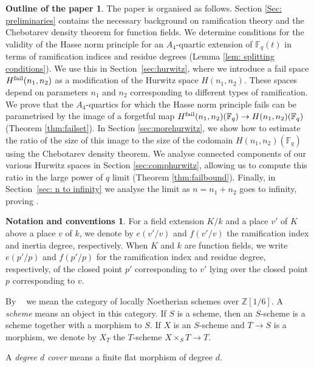 \documentclass{amsart}
\numberwithin{equation}{section} \numberwithin{figure}{section}
\DeclareMathOperator{\Schemes}{\underline{Schemes}}
\newcommand\ZZ{\mathbb{Z}}
\theoremstyle{one}
\theoremstyle{definition}
\newtheorem*{notation}{Notation and conventions}
\newtheorem*{outline}{Outline of the paper}
\begin{document}
\begin{outline}The paper is organised as follows. Section \ref{Sec: preliminaries} contains the necessary background on ramification theory and the Chebotarev density theorem for function fields. We determine conditions for the validity of the Hasse norm principle for an $A_4$-quartic extension of $\mathbb{F}_q(t)$ in terms of ramification indices and residue degrees (Lemma \ref{lem: splitting conditions}). We use this in Section~\ref{sec:hurwitz}, where we introduce a fail space $H^{\rm{fail}}(n_1,n_2)$ as a modification of the Hurwitz space $H(n_1,n_2)$. These spaces depend on parameters $n_1$ and $n_2$ corresponding to different types of ramification. We prove that the $A_4$-quartics for which the Hasse norm principle fails can be parametrised by the image of a forgetful map $H^{\rm{fail}}(n_1,n_2)(\mathbb{F}_q)\to H(n_1,n_2)(\mathbb{F}_q)$ (Theorem \ref{thm:failset}). In Section \ref{sec:morehurwitz}, we show how to estimate the ratio of the size of this image to the size of the codomain $H(n_1,n_2)(\mathbb{F}_q)$ using the Chebotarev density theorem. We analyse connected components of our various Hurwitz spaces in Section \ref{sec:comphurwitz}, allowing us to compute this ratio in the large power of $q$ limit (Theorem \ref{thm:failbound}). Finally, in Section~\ref{sec: n to infinity} we analyse the limit as $n=n_1+n_2$ goes to infinity, proving . 
\end{outline}

\begin{notation} 
  For a field extension $K/k$ and a place $v'$ of $ K$ above a place $v$ of $k$, we denote by $e(v'/v)$ and $f(v'/v)$ the ramification index and inertia degree, respectively. When $K$ and $k$ are function fields, we write $e(p'/p)$ and $f(p'/p)$ for the ramification index and residue degree, respectively, of the closed point $p'$ corresponding to $v'$ lying over the closed point $p$ corresponding to $v$.
  
  
  By \(\Schemes\) we mean the category of locally Noetherian schemes over \(\ZZ[1/6]\).
A \emph{scheme} means an object in this category.
If \(S\) is a scheme, then an \(S\)-scheme is a scheme together with a morphism to \(S\).
If \(X\) is an \(S\)-scheme and \(T \to S\) is a morphism, we denote by \(X_T\) the \(T\)-scheme \(X \times_S T \to T\).

A \emph{degree \(d\) cover} means a finite flat morphism of degree \(d\).




\end{notation}
\end{document}
